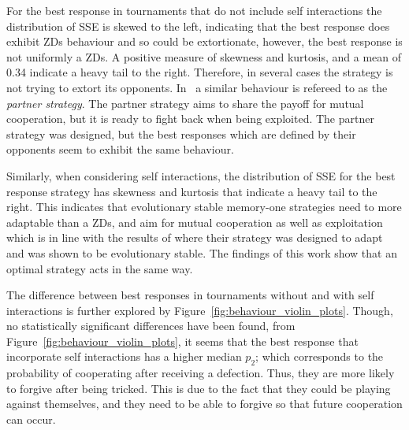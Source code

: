 For the best response in tournaments that do not include self interactions the
distribution of SSE is skewed to the left, indicating that the best response
does exhibit ZDs behaviour and so could be extortionate, however, the best
response is not uniformly a ZDs. A positive measure of skewness and kurtosis,
and a mean of 0.34 indicate a heavy tail to the right. Therefore, in several
cases the strategy is not trying to extort its opponents. In~\cite{Hilbe2018} a
similar behaviour is refereed to as the \textit{partner strategy}. The partner
strategy aims to share the payoff for mutual cooperation, but it is ready to
fight back when being exploited. The partner strategy was designed, but the best
responses which are defined by their opponents seem to exhibit the same
behaviour.

Similarly, when considering self interactions, the distribution of SSE for the
best response strategy has skewness and kurtosis that indicate a heavy tail to
the right. This indicates that evolutionary stable memory-one strategies need to
more adaptable than a ZDs, and aim for mutual cooperation as well as
exploitation which is in line with the results of \cite{Hilbe2018} where their
strategy was designed to adapt and was shown to be evolutionary stable. The
findings of this work show that an optimal strategy acts in the same way.

The difference between best responses in tournaments without and with self
interactions is further explored by Figure~\ref{fig:behaviour_violin_plots}.
Though, no statistically significant differences have been found, from
Figure~\ref{fig:behaviour_violin_plots}, it seems that the best response that
incorporate self interactions has a higher median $p_2$; which corresponds to
the probability of cooperating after receiving a defection. Thus, they are more
likely to forgive after being tricked. This is due to the fact that they could
be playing against themselves, and they need to be able to forgive so that
future cooperation can occur.

